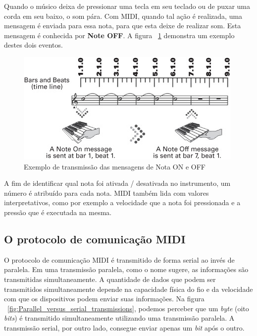             Quando o músico deixa de pressionar uma tecla em seu teclado ou de puxar uma corda em seu baixo, o som pára. Com MIDI, quando tal ação é realizada, uma mensagem é enviada para essa nota, para que esta deixe de realizar som. Esta mensagem é conhecida por \textbf{Note OFF}. A figura ~\ref{fig:MIDI_Nota_ON_e_OFF} demonstra um exemplo destes dois eventos.

            \begin{figure}[H]
            	\centering
            	\includegraphics{Imagens/MIDI_Nota_ON_e_OFF.jpg}
            	\caption[Exemplo de transmissão das mensagens de Nota ON e OFF]{Exemplo de transmissão das mensagens de Nota ON e OFF ~\cite{Guerin}}
            	\label{fig:MIDI_Nota_ON_e_OFF}
            \end{figure}

            A fim de identificar qual nota foi ativada / desativada no instrumento, um número é atribuído para cada nota. MIDI também lida com valores interpretativos, como por exemplo a velocidade que a nota foi pressionada e a pressão que é executada na mesma.

        \subsection{O protocolo de comunicação MIDI}

            O protocolo de comunicação MIDI é transmitido de forma serial ao invés de paralela. Em uma transmissão paralela, como o nome sugere, as informações são transmitidas simultaneamente. A quantidade de dados que podem ser transmitidos simultaneamente depende na capacidade física do fio e da velocidade com que os dispositivos podem enviar suas informações. Na figura ~\ref{fig:Parallel_versus_serial_transmissions}, podemos perceber que um \textit{byte} (oito \textit{bits}) é transmitido simultaneamente utilizando uma transmissão paralela. A transmissão serial, por outro lado, consegue enviar apenas um \textit{bit} após o outro.

